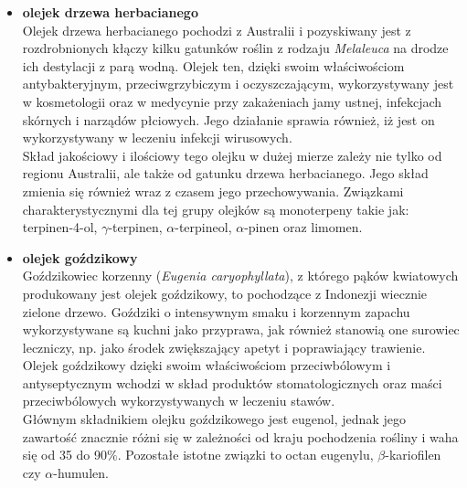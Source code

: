 \documentclass[11pt,a4paper]{report}
\begin{document}
\begin{itemize}
\item \textbf{olejek drzewa herbacianego}\\
Olejek drzewa herbacianego pochodzi z Australii i pozyskiwany jest z rozdrobnionych kłączy kilku gatunków roślin z rodzaju \textit{Melaleuca} na drodze ich destylacji z parą wodną\cite{pollena_d}.
Olejek ten, dzięki swoim właściwościom  antybakteryjnym, przeciwgrzybiczym i oczyszczającym, wykorzystywany jest w kosmetologii oraz w medycynie przy zakażeniach jamy ustnej, infekcjach skórnych i narządów płciowych. Jego działanie sprawia również, iż jest on wykorzystywany w leczeniu infekcji wirusowych\cite{pollena, pollena_d, lis}.\\
Skład jakościowy i ilościowy tego olejku w dużej mierze zależy nie tylko od regionu Australii, ale także od gatunku drzewa herbacianego. Jego skład zmienia się również wraz z czasem jego przechowywania. Związkami charakterystycznymi dla tej grupy olejków są monoterpeny takie jak: terpinen-4-ol, $\gamma$-terpinen, $\alpha$-terpineol, $\alpha$-pinen oraz limomen\cite{Kreck, lis}.


\item \textbf{olejek goździkowy}\\
Goździkowiec korzenny (\textit{Eugenia caryophyllata}), z którego pąków kwiatowych produkowany jest olejek goździkowy, to pochodzące z Indonezji wiecznie zielone drzewo. Goździki o intensywnym smaku i korzennym zapachu wykorzystywane są kuchni jako przyprawa, jak również stanowią one surowiec leczniczy, np. jako środek zwiększający apetyt i poprawiający trawienie. Olejek goździkowy dzięki swoim właściwościom przeciwbólowym i antyseptycznym wchodzi w skład produktów stomatologicznych oraz maści przeciwbólowych wykorzystywanych w leczeniu stawów\cite{brud1992, gorailis}.\\
Głównym składnikiem olejku goździkowego jest eugenol, jednak jego zawartość znacznie różni się w zależności od kraju pochodzenia rośliny i waha się od 35 do 90$\%$. Pozostałe istotne związki to octan eugenylu, $\beta$-kariofilen czy $\alpha$-humulen\cite{gorailis}.



\end{itemize}
\end{document}
